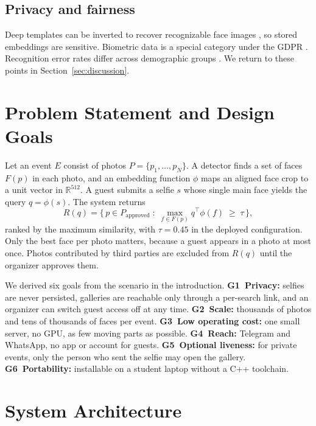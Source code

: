 \documentclass[conference]{IEEEtran}
\begin{document}
\subsection{Privacy and fairness}
Deep templates can be inverted to recover recognizable face images \cite{mai2019reconstruction}, so stored embeddings are sensitive. Biometric data is a special category under the GDPR \cite{gdpr}. Recognition error rates differ across demographic groups \cite{buolamwini2018,grother2019frvt}. We return to these points in Section~\ref{sec:discussion}.

\section{Problem Statement and Design Goals}\label{sec:problem}
Let an event $E$ consist of photos $P=\{p_1,\dots,p_N\}$. A detector finds a set of faces $F(p)$ in each photo, and an embedding function $\phi$ maps an aligned face crop to a unit vector in $\mathbb{R}^{512}$. A guest submits a selfie $s$ whose single main face yields the query $q=\phi(s)$. The system returns
\begin{equation}
R(q)=\Big\{\,p\in P_{\mathrm{approved}} \;:\; \max_{f\in F(p)} q^{\top}\phi(f)\;\ge\;\tau\,\Big\},
\label{eq:match}
\end{equation}
ranked by the maximum similarity, with $\tau=0.45$ in the deployed configuration. Only the best face per photo matters, because a guest appears in a photo at most once. Photos contributed by third parties are excluded from $R(q)$ until the organizer approves them.

We derived six goals from the scenario in the introduction.
\textbf{G1~Privacy:} selfies are never persisted, galleries are reachable only through a per-search link, and an organizer can switch guest access off at any time.
\textbf{G2~Scale:} thousands of photos and tens of thousands of faces per event.
\textbf{G3~Low operating cost:} one small server, no GPU, as few moving parts as possible.
\textbf{G4~Reach:} Telegram and WhatsApp, no app or account for guests.
\textbf{G5~Optional liveness:} for private events, only the person who sent the selfie may open the gallery.
\textbf{G6~Portability:} installable on a student laptop without a C++ toolchain.

\section{System Architecture}\label{sec:arch}
\end{document}
